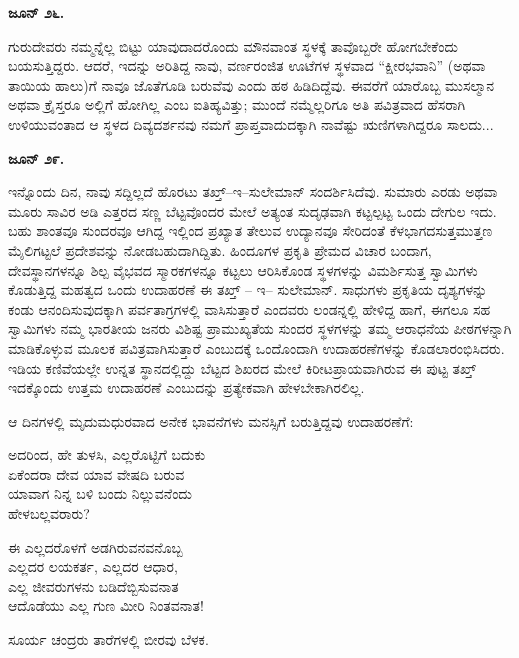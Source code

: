 \textbf{ಜೂನ್ ೨೬.}

ಗುರುದೇವರು ನಮ್ಮನ್ನೆಲ್ಲ ಬಿಟ್ಟು ಯಾವುದಾದರೊಂದು ಮೌನವಾಂತ ಸ್ಥಳಕ್ಕೆ ತಾವೊಬ್ಬರೇ ಹೋಗಬೇಕೆಂದು ಬಯಸುತ್ತಿದ್ದರು. ಆದರೆ, ಇದನ್ನು ಅರಿತಿದ್ದ ನಾವು, ವರ್ಣರಂಜಿತ ಊಟೆಗಳ ಸ್ಥಳವಾದ “ಕ್ಷೀರಭವಾನಿ” (ಅಥವಾ ತಾಯಿಯ ಹಾಲು)ಗೆ ನಾವೂ ಜೊತೆಗೂಡಿ ಬರುವೆವು ಎಂದು ಹಠ ಹಿಡಿದಿದ್ದೆವು. ಈವರೆಗೆ ಯಾರೊಬ್ಬ ಮುಸಲ್ಮಾನ ಅಥವಾ ಕ್ರೈಸ್ತರೂ ಅಲ್ಲಿಗೆ ಹೋಗಿಲ್ಲ ಎಂಬ ಐತಿಹ್ಯವಿತ್ತು; ಮುಂದೆ ನಮ್ಮೆಲ್ಲರಿಗೂ ಅತಿ ಪವಿತ್ರವಾದ ಹೆಸರಾಗಿ ಉಳಿಯುವಂತಾದ ಆ ಸ್ಥಳದ ದಿವ್ಯದರ್ಶನವು ನಮಗೆ ಪ್ರಾಪ್ತವಾದುದಕ್ಕಾಗಿ ನಾವೆಷ್ಟು ಋಣಿಗಳಾಗಿದ್ದರೂ ಸಾಲದು...

\textbf{ಜೂನ್ ೨೯.}

ಇನ್ನೊಂದು ದಿನ, ನಾವು ಸದ್ದಿಲ್ಲದೆ ಹೊರಟು ತಖ್ತ್–ಇ–ಸುಲೇಮಾನ್ ಸಂದರ್ಶಿಸಿದೆವು. ಸುಮಾರು ಎರಡು ಅಥವಾ ಮೂರು ಸಾವಿರ ಅಡಿ ಎತ್ತರದ ಸಣ್ಣ ಬೆಟ್ಟವೊಂದರ ಮೇಲೆ ಅತ್ಯಂತ ಸುದೃಢವಾಗಿ ಕಟ್ಟಲ್ಪಟ್ಟ ಒಂದು ದೇಗುಲ ಇದು. ಬಹು ಶಾಂತವೂ ಸುಂದರವೂ ಆಗಿದ್ದ ಇಲ್ಲಿಂದ ಪ್ರಖ್ಯಾತ ತೇಲುವ ಉದ್ಯಾನವೂ ಸೇರಿದಂತೆ ಕೆಳಭಾಗದಸುತ್ತಮುತ್ತಣ ಮೈಲಿಗಟ್ಟಲೆ ಪ್ರದೇಶವನ್ನು ನೋಡಬಹುದಾಗಿದ್ದಿತು. ಹಿಂದೂಗಳ ಪ್ರಕೃತಿ ಪ್ರೇಮದ ವಿಚಾರ ಬಂದಾಗ, ದೇವಸ್ಥಾನಗಳನ್ನೂ ಶಿಲ್ಪ ವೈಭವದ ಸ್ಮಾರಕಗಳನ್ನೂ ಕಟ್ಟಲು ಆರಿಸಿಕೊಂಡ ಸ್ಥಳಗಳನ್ನು ವಿಮರ್ಶಿಸುತ್ತ ಸ್ವಾಮಿಗಳು ಕೊಡುತ್ತಿದ್ದ ಮಹತ್ವದ ಒಂದು ಉದಾಹರಣೆ ಈ ತಖ್ತ್ – ಇ– ಸುಲೇಮಾನ್. ಸಾಧುಗಳು ಪ್ರಕೃತಿಯ ದೃಶ್ಯಗಳನ್ನು ಕಂಡು ಆನಂದಿಸುವುದಕ್ಕಾಗಿ ಪರ್ವತಾಗ್ರಗಳಲ್ಲಿ ವಾಸಿಸುತ್ತಾರೆ ಎಂದವರು ಲಂಡನ್ನಲ್ಲಿ ಹೇಳಿದ್ದ ಹಾಗೆ, ಈಗಲೂ ಸಹ ಸ್ವಾಮಿಗಳು ನಮ್ಮ ಭಾರತೀಯ ಜನರು ವಿಶಿಷ್ಟ ಪ್ರಾಮುಖ್ಯತೆಯ ಸುಂದರ ಸ್ಥಳಗಳನ್ನು ತಮ್ಮ ಆರಾಧನೆಯ ಪೀಠಗಳನ್ನಾಗಿ ಮಾಡಿಕೊಳ್ಳುವ ಮೂಲಕ ಪವಿತ್ರವಾಗಿಸುತ್ತಾರೆ ಎಂಬುದಕ್ಕೆ ಒಂದೊಂದಾಗಿ ಉದಾಹರಣೆಗಳನ್ನು ಕೊಡಲಾರಂಭಿಸಿದರು. ಇಡಿಯ ಕಣಿವೆಯಲ್ಲೇ ಉನ್ನತ ಸ್ಥಾನದಲ್ಲಿದ್ದು ಬೆಟ್ಟದ ಶಿಖರದ ಮೇಲೆ ಕಿರೀಟಪ್ರಾಯವಾಗಿರುವ ಈ ಪುಟ್ಟ ತಖ್ತ್ ಇದಕ್ಕೊಂದು ಉತ್ತಮ ಉದಾಹರಣೆ ಎಂಬುದನ್ನು ಪ್ರತ್ಯೇಕವಾಗಿ ಹೇಳಬೇಕಾಗಿರಲಿಲ್ಲ.

ಆ ದಿನಗಳಲ್ಲಿ ಮೃದುಮಧುರವಾದ ಅನೇಕ ಭಾವನೆಗಳು ಮನಸ್ಸಿಗೆ ಬರುತ್ತಿದ್ದವು ಉದಾಹರಣೆಗೆ:

\begin{myquote}
ಅದರಿಂದ, ಹೇ ತುಳಸಿ, ಎಲ್ಲರೊಟ್ಟಿಗೆ ಬದುಕು\\ಏಕೆಂದರಾ ದೇವ ಯಾವ ವೇಷದಿ ಬರುವ\\ಯಾವಾಗ ನಿನ್ನ ಬಳಿ ಬಂದು ನಿಲ್ಲುವನೆಂದು\\ಹೇಳಬಲ್ಲವರಾರು?
\end{myquote}

\begin{myquote}
ಈ ಎಲ್ಲದರೊಳಗೆ ಅಡಗಿರುವನವನೊಬ್ಬ\\ಎಲ್ಲದರ ಲಯಕರ್ತ, ಎಲ್ಲದರ ಆಧಾರ,\\ಎಲ್ಲ ಜೀವರುಗಳನು ಬಡಿದೆಬ್ಬಿಸುವನಾತ\\ಆದೊಡೆಯು ಎಲ್ಲ ಗುಣ ಮೀರಿ ನಿಂತವನಾತ!
\end{myquote}

\begin{myquote}
ಸೂರ್ಯ ಚಂದ್ರರು ತಾರೆಗಳಲ್ಲಿ ಬೀರವು ಬೆಳಕ.
\end{myquote}

